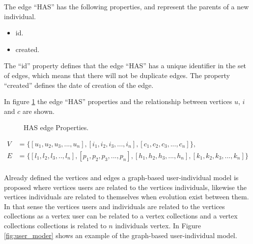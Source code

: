The edge “HAS” has the following properties, and represent the parents of a new individual.
\begin{itemize}
\item id.
\item created.
\end{itemize}

The “id” property defines that the edge “HAS” has a unique identifier in the set of edges, which means that there will not be duplicate edges.
The property “created” defines the date of creation of the edge.

In figure \ref{fig:Has_edge} the edge “HAS” properties and the relationship between vertices $u$, $i$ and $c$ are shown.

\begin{figure}
\captionsetup{justification=centering,margin=2cm}
\centering
\setlength\fboxsep{0pt}
\setlength\fboxrule{0.7pt}
\caption{HAS edge Properties.}
\label{fig:Has_edge}
\end{figure}

\begin{equation*}\label{eq:graphRelDef}
\displaystyle
\begin{split}
V &= \{[u_1,u_2,u_3,...,u_n],[i_1,i_2,i_3,...,i_n],[c_1,c_2,c_3,...,c_n]\},\\
E&= \{[l_1,l_2,l_3,..,l_n],[p_1,p_2,p_3,...,p_n],[h_1,h_2,h_3,...,h_n],[k_1,k_2,k_3,...,k_n]\}\\
\end{split}
\end{equation*}

Already defined the vertices and edges a graph-based user-individual model is
proposed where vertices users are related to the vertices individuals, likewise
the vertices individuals are related to themselves when evolution exist between
them. In that sense the vertices users and individuals are related to the
vertices collections as a vertex user can be related to a vertex collections and
a vertex collections collections is related to $n$ individuals vertex. In Figure
\ref{fig:user_moder} shows an example of the graph-based user-individual model.

